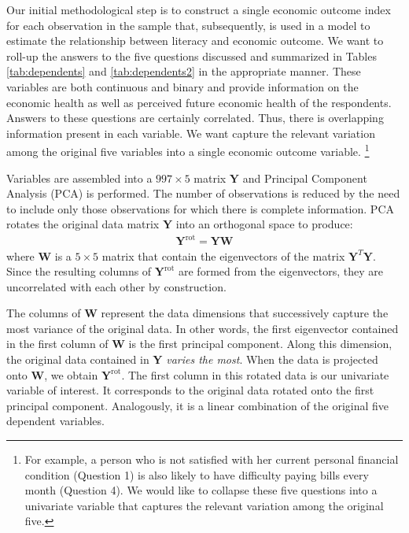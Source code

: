 \documentclass[12pt]{article}
\theoremstyle{plain}
\begin{document}
Our initial methodological step is to construct a single economic outcome index for each observation in the sample that, subsequently, is used in a model to estimate the relationship between literacy and economic outcome.  We want to roll-up the answers to the five questions discussed and summarized in Tables \ref{tab:dependents} and \ref{tab:dependents2} in the appropriate manner. These variables are both continuous and binary and provide information on the economic health as well as perceived future economic health of the respondents.  Answers to these questions are certainly correlated.  Thus, there is overlapping information present in each variable. We want capture the relevant variation among the original five variables into a single economic outcome variable. \footnote{For example, a person who is not satisfied with her current personal financial condition (Question 1) is also likely to have difficulty paying bills every month (Question 4).   We would like to collapse these five questions into a univariate variable that captures the relevant variation among the original five.} 

Variables are assembled into a $997 \times 5$ matrix $\textbf{Y}$ and Principal Component Analysis (PCA) is performed. The number of observations is reduced by the need to include only those observations for which there is complete information. PCA rotates the original data matrix $\textbf{Y}$ into an orthogonal space to produce:
\begin{equation}
	\begin{split}
		\textbf{Y}^{\text{rot}} = \textbf{Y}\textbf{W}
	\end{split}
\end{equation}where \textbf{W} is a $5 \times 5$ matrix that contain the eigenvectors of the matrix $\textbf{Y}^{T}\textbf{Y}$.  Since the resulting columns of $\textbf{Y}^{\text{rot}}$ are formed from the eigenvectors, they are uncorrelated with each other by construction.

The columns of \textbf{W} represent the data dimensions that successively capture the most variance of the original data.  In other words, the first eigenvector contained in the first column of \textbf{W} is the first principal component.  Along this dimension, the original data contained in \textbf{Y} \textit{varies the most}.  When the data is projected onto \textbf{W}, we obtain $\textbf{Y}^{\text{rot}}$.  The first column in this rotated data is our univariate variable of interest. It corresponds to the original data rotated onto the first principal component.  Analogously, it is a linear combination of the original five dependent variables.
\end{document}
